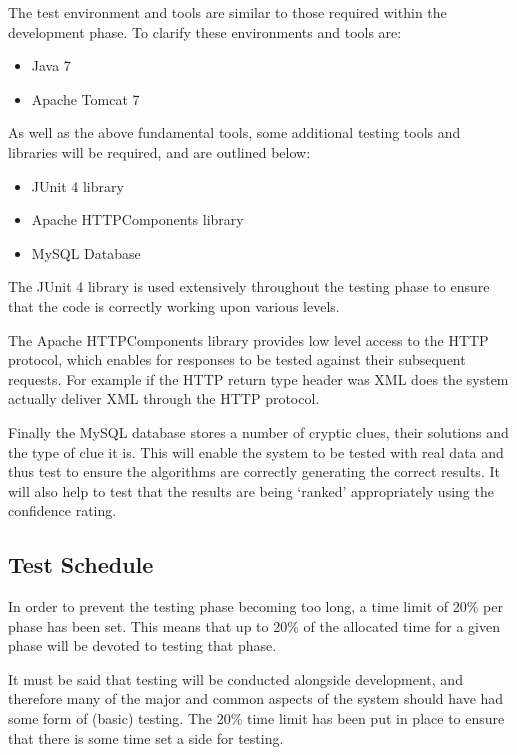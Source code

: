 The test environment and tools are similar to those required within the 
development phase. To clarify these environments and tools are:

\begin{itemize}
  \item Java 7
  \item Apache Tomcat 7
\end{itemize}

As well as the above fundamental tools, some additional testing tools and 
libraries will be required, and are outlined below:

\begin{itemize}
  \item JUnit 4 library
  \item Apache HTTPComponents library
  \item MySQL Database
\end{itemize}

The JUnit 4 library is used extensively throughout the testing phase to ensure
that the code is correctly working upon various levels.

The Apache HTTPComponents library provides low level access to the HTTP
protocol, which enables for responses to be tested against their subsequent
requests. For example if the HTTP return type header was XML does the system
actually deliver XML through the HTTP protocol.

Finally the MySQL database stores a number of cryptic clues, their solutions and
the type of clue it is. This will enable the system to be tested with real data
and thus test to ensure the algorithms are correctly generating the correct 
results. It will also help to test that the results are being `ranked' 
appropriately using the confidence rating.


\subsection{Test Schedule}
\label{sub:test_schedule}

In order to prevent the testing phase becoming too long, a time limit of 20\% 
per phase has been set. This means that up to 20\% of the allocated time for a 
given phase will be devoted to testing that phase.

It must be said that testing will be conducted alongside development, and 
therefore many of the major and common aspects of the system should have had 
some form of (basic) testing. The 20\% time limit has been put in place to 
ensure that there is some time set a side for testing.

